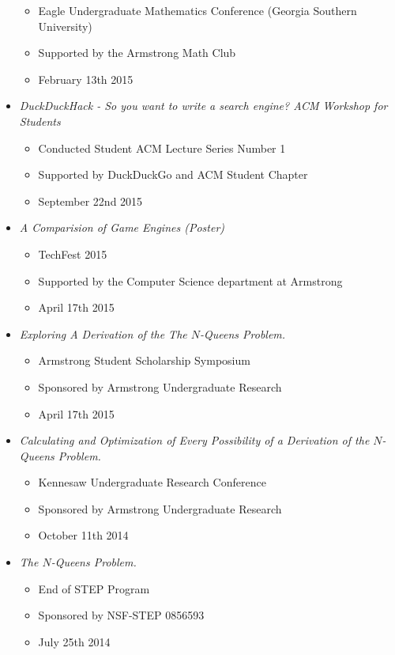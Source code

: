 \documentclass[11pt]{article} %
\begin{document}
\begin{itemize}
\begin{itemize}
	  	\setlength{\itemsep}{1pt}
  		\setlength{\parskip}{0pt}
 	 	\setlength{\parsep}{0pt}
	\item Eagle Undergraduate Mathematics Conference (Georgia Southern University)
	\item Supported by the Armstrong Math Club
	\item February 13th 2015
	\end{itemize}
\item \textit{DuckDuckHack - So you want to write a search engine? ACM Workshop for Students}
\begin{itemize}
	  	\setlength{\itemsep}{1pt}
  		\setlength{\parskip}{0pt}
 	 	\setlength{\parsep}{0pt}
	\item Conducted Student ACM Lecture Series Number 1
	\item Supported by DuckDuckGo and ACM Student Chapter
	\item September 22nd 2015
	\end{itemize}
\item \textit{A Comparision of Game Engines (Poster)}
\begin{itemize}
	  	\setlength{\itemsep}{1pt}
  		\setlength{\parskip}{0pt}
 	 	\setlength{\parsep}{0pt}
	\item TechFest 2015
	\item Supported by the Computer Science department at Armstrong
	\item April 17th 2015
	\end{itemize}
\item \textit{Exploring A Derivation of the The $N$-Queens Problem.} 
\begin{itemize}
	  	\setlength{\itemsep}{1pt}
  		\setlength{\parskip}{0pt}
 	 	\setlength{\parsep}{0pt}
	\item Armstrong Student Scholarship Symposium
	\item Sponsored by Armstrong Undergraduate Research
	\item April 17th 2015
	\end{itemize}
\item \textit{Calculating and Optimization of Every Possibility of a Derivation of the $N$-Queens Problem.}
\begin{itemize}
	  	\setlength{\itemsep}{1pt}
  		\setlength{\parskip}{0pt}
 	 	\setlength{\parsep}{0pt}
	\item Kennesaw Undergraduate Research Conference
	\item Sponsored by Armstrong Undergraduate Research
	\item October 11th 2014
	\end{itemize}

\item \textit{The $N$-Queens Problem.}
	\begin{itemize}
	  	\setlength{\itemsep}{1pt}
  		\setlength{\parskip}{0pt}
 	 	\setlength{\parsep}{0pt}
	\item End of STEP Program
	\item Sponsored by NSF-STEP 0856593
	\item July 25th 2014
	\end{itemize}
\end{itemize}
\end{document}

